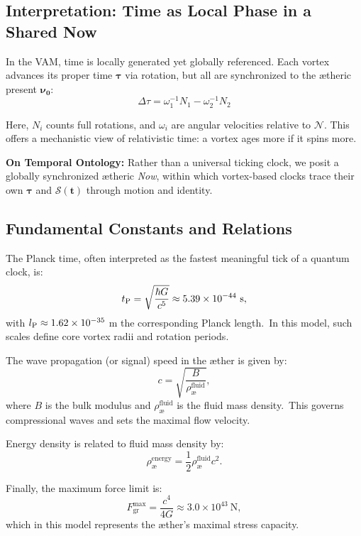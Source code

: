 \subsection*{Interpretation: Time as Local Phase in a Shared Now}

In the VAM, time is locally generated yet globally referenced. Each vortex advances its proper time $\boldsymbol{\tau}$ via rotation, but all are synchronized to the ætheric present $\boldsymbol{\nu_0}$:
\[
\Delta \tau = \omega_1^{-1} N_1 - \omega_2^{-1} N_2
\tag{Vortex Clock Synchronization}
\]

Here, $N_i$ counts full rotations, and $\omega_i$ are angular velocities relative to $\boldsymbol{\mathcal{N}}$. This offers a mechanistic view of relativistic time: a vortex ages more if it spins more.

\begin{remark}
\textbf{On Temporal Ontology:} Rather than a universal ticking clock, we posit a globally synchronized ætheric \emph{Now}, within which vortex-based clocks trace their own $\boldsymbol{\tau}$ and $\boldsymbol{\mathcal{S}(t)}$ through motion and identity.
\end{remark}


\subsection*{Fundamental Constants and Relations}
The Planck time, often interpreted as the fastest meaningful tick of a quantum clock, is:
\[
    t_{\textrm P} = \sqrt{\frac{\hbar G}{c^5}} \approx 5.39\times10^{-44}\ \text{s},
\]
with $l_{\textrm P} \approx 1.62\times10^{-35}$ m the corresponding Planck length.\ In this model, such scales define core vortex radii and rotation periods.

The wave propagation (or signal) speed in the æther is given by:
\[
    c = \sqrt{\frac{B}{\rho^{\text{fluid}}_{\text{\ae}}}},
\]
where $B$ is the bulk modulus and $\rho^{\text{fluid}}_{\text{\ae}}$ is the fluid mass density.\ This governs compressional waves and sets the maximal flow velocity.

Energy density is related to fluid mass density by:
\[
    \rho^{\text{energy}}_{\text{\ae}} = \frac{1}{2} \rho^{\text{fluid}}_{\text{\ae}} c^2.
\]

Finally, the maximum force limit is:
\[
    F^{\text{max}}_{\text{gr}} = \frac{c^4}{4G} \approx 3.0 \times 10^{43}\ \text{N},
\]
which in this model represents the æther’s maximal stress capacity.